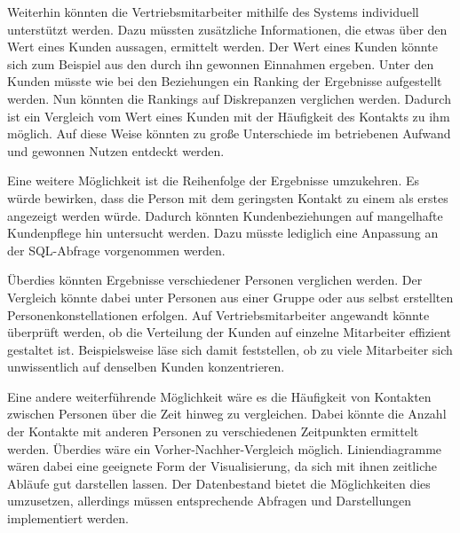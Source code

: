 Weiterhin könnten die Vertriebsmitarbeiter mithilfe des Systems individuell unterstützt werden. Dazu müssten zusätzliche Informationen, die etwas über den Wert eines Kunden aussagen, ermittelt werden. Der Wert eines Kunden könnte sich zum Beispiel aus den durch ihn gewonnen Einnahmen ergeben. Unter den Kunden müsste wie bei den Beziehungen ein Ranking der Ergebnisse aufgestellt werden. Nun könnten die Rankings auf Diskrepanzen verglichen werden. Dadurch ist ein Vergleich vom Wert eines Kunden mit der Häufigkeit des Kontakts zu ihm möglich. Auf diese Weise könnten zu große Unterschiede im betriebenen Aufwand und gewonnen Nutzen entdeckt werden. 

Eine weitere Möglichkeit ist die Reihenfolge der Ergebnisse umzukehren. Es würde bewirken, dass die Person mit dem geringsten Kontakt zu einem als erstes angezeigt werden würde. Dadurch könnten Kundenbeziehungen auf mangelhafte Kundenpflege hin untersucht werden. Dazu müsste lediglich eine Anpassung an der SQL-Abfrage vorgenommen werden.

Überdies könnten Ergebnisse verschiedener Personen verglichen werden. Der Vergleich könnte dabei unter Personen aus einer Gruppe oder aus selbst erstellten Personenkonstellationen erfolgen. Auf Vertriebsmitarbeiter angewandt könnte überprüft werden, ob die Verteilung der Kunden auf einzelne Mitarbeiter effizient gestaltet ist. Beispielsweise läse sich damit feststellen, ob zu viele Mitarbeiter sich unwissentlich auf denselben Kunden konzentrieren.

Eine andere weiterführende Möglichkeit wäre es die Häufigkeit von Kontakten  zwischen Personen über die Zeit hinweg zu vergleichen. Dabei könnte die Anzahl der Kontakte mit anderen Personen zu verschiedenen Zeitpunkten ermittelt werden. Überdies wäre ein Vorher-Nachher-Vergleich möglich. Liniendiagramme wären dabei eine geeignete Form der Visualisierung, da sich mit ihnen zeitliche Abläufe gut darstellen lassen. Der Datenbestand bietet die Möglichkeiten dies umzusetzen, allerdings müssen entsprechende Abfragen und Darstellungen implementiert werden.  
